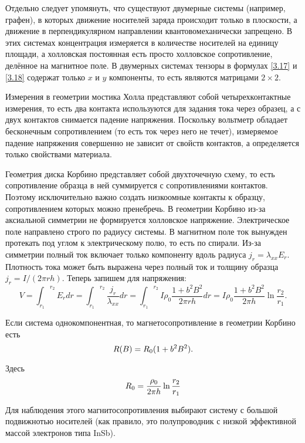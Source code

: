 Отдельно следует упомянуть, что существуют двумерные системы (например, графен), в которых движение носителей заряда происходит только в плоскости, а движение в перпендикулярном направлении квантовомеханически запрещено. В этих системах концентрация измеряется в количестве носителей на единицу площади, а холловская постоянная есть просто холловское сопротивление, делённое на магнитное поле. В двумерных системах тензоры в формулах \eqref{3.17} и \eqref{3.18} содержат только $x$ и $y$ компоненты, то есть являются матрицами $2\times2$.

Измерения в геометрии мостика Холла представляют собой четырехконтактные измерения, то есть два контакта используются для задания тока через образец, а с двух контактов снимается падение напряжения. Поскольку вольтметр обладает бесконечным сопротивлением (то есть ток через него не течет), измеряемое падение напряжения совершенно не зависит от свойств контактов, а определяется только свойствами материала.

Геометрия диска Корбино представляет собой двухточечную схему, то есть сопротивление образца в ней суммируется с сопротивлениями контактов. Поэтому исключительно важно создать низкоомные контакты к образцу, сопротивлением которых можно пренебречь. В геометрии Корбино из-за аксиальной симметрии не формируется холловское напряжение. Электрическое поле направлено строго по радиусу системы. В магнитном поле ток вынужден протекать под углом к электрическому полю, то есть по спирали. Из-за симметрии полный ток включает только компоненту вдоль радиуса $j_r=\lambda_{xx} E_r$. Плотность тока может быть выражена через полный ток и толщину образца $j_r=I/(2\pi rh)$. Теперь запишем для напряжения:
\begin{equation*}
V={\int_{r_1}}^{r_2}E_r dr={\int_{r_1}}^{r_2}\frac{j_r}{\lambda_{xx}} dr={\int_{r_1}}^{r_2}I\rho_0\frac{1+b^2B^2}{2\pi rh}dr=I\rho_0\frac{1+b^2B^2}{2\pi h}\ln{\frac{r_2}{r_1}}.
\end{equation*}

Если система однокомпонентная, то магнетосопротивление в геометрии Корбино есть
\begin{equation}
	R(B) = R_0(1+b^2B^2)
	\eqmark{MagnetoSoprot}.
\end{equation}

Здесь
\begin{equation}
	R_0 = \frac{\rho_0}{2\pi h} \ln{\frac{r_2}{r_1}}
	\eqmark{KorbinoSoprot}
\end{equation}

Для наблюдения этого магнитосопротивления выбирают систему с большой подвижнотью носителей (как правило, это полупроводник с низкой эффективной массой электронов типа InSb).

